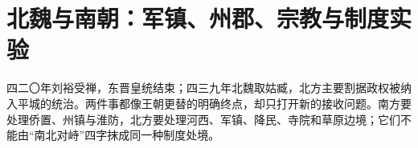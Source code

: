 \chapter{北魏与南朝：军镇、州郡、宗教与制度实验}
\label{ch:northern-southern-dynasties}






\begin{turningpoint}
四二〇年刘裕受禅，东晋皇统结束；四三九年北魏取姑臧，北方主要割据政权被纳入平城的统治。两件事都像王朝更替的明确终点，却只打开新的接收问题。南方要处理侨置、州镇与淮防，北方要处理河西、军镇、降民、寺院和草原边境；它们不能由“南北对峙”四字抹成同一种制度处境。
\end{turningpoint}
